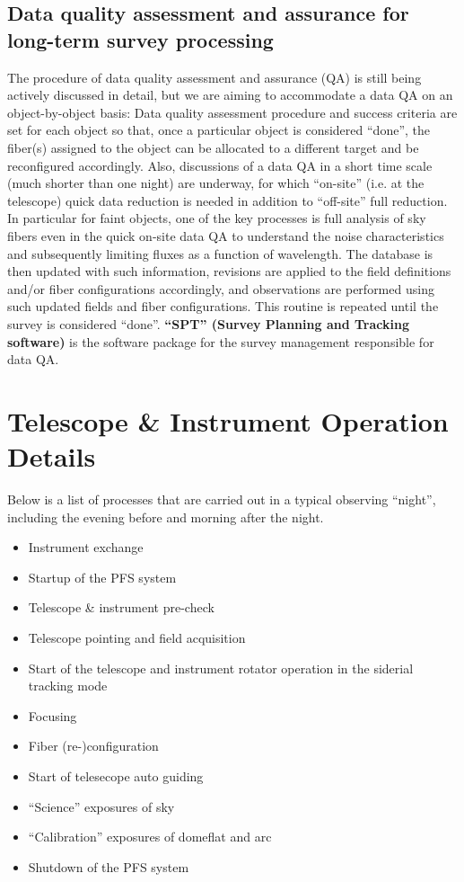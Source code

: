 \documentclass[a4paper]{article}
\begin{document}
\subsection{Data quality assessment and assurance for long-term survey processing}

The procedure of data quality assessment and assurance (QA) is still
being actively discussed in detail, but we are aiming to accommodate a
data QA on an object-by-object basis: Data quality assessment
procedure and success criteria are set for each object so that, once a
particular object is considered ``done'', the fiber(s) assigned to the
object can be allocated to a different target and be reconfigured
accordingly. Also, discussions of a data QA in a short time scale
(much shorter than one night) are underway, for which ``on-site''
(i.e. at the telescope) quick data reduction is needed in addition to
``off-site'' full reduction. In particular for faint objects, one of
the key processes is full analysis of sky fibers even in the quick
on-site data QA to understand the noise characteristics and
subsequently limiting fluxes as a function of wavelength. The database
is then updated with such information, revisions are applied to the
field definitions and/or fiber configurations accordingly, and
observations are performed using such updated fields and fiber
configurations. This routine is repeated until the survey is
considered ``done''. {\bf ``SPT'' (Survey Planning and Tracking
  software)} is the software package for the survey management
responsible for data QA.

\section{Telescope \& Instrument Operation Details\label{sec:detail_ope_plan}}

Below is a list of processes that are carried out in a typical
observing ``night'', including the evening before and morning after
the night.

\begin{itemize}
\item Instrument exchange
\item Startup of the PFS system
\item Telescope \& instrument pre-check
\item Telescope pointing and field acquisition
\item Start of the telescope and instrument rotator operation in the siderial tracking mode
\item Focusing
\item Fiber (re-)configuration
\item Start of telesecope auto guiding
\item ``Science'' exposures of sky
\item ``Calibration'' exposures of domeflat and arc
\item Shutdown of the PFS system
\end{itemize}
\end{document}
